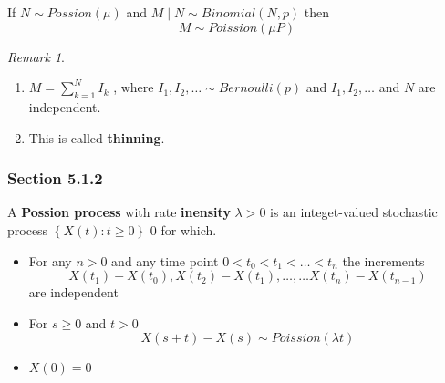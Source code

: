 \documentclass{article}
\theoremstyle{remark}
\newtheorem*{remark}{Remark}
\begin{document}
\begin{theorem}
  If $N \sim Possion(\mu )$  and $ M  \mid  N \sim Binomial(N,p)$ then \[
    M \sim Poission(\mu P)
  \]  
\end{theorem}

\begin{remark}
  \begin{enumerate}[label=(\roman*)]
    \item $M = \sum_{k= 1}^{ N}  I_{k}$ , where $ I_{1}, I_{2} , \ldots \sim Bernoulli (p)$ and $I_{1}, I_{2} , \ldots$ and $N$ are independent. 
    \item This is called \textbf{thinning}.  
  \end{enumerate}
\end{remark}

\subsubsection{Section 5.1.2}%
\label{ssub:section_5_1_2}

\begin{definition}
  A \textbf{Possion process}  with rate  \textbf{inensity}  $ \lambda > 0$ is an integet-valued stochastic process $\left\{ X\left( t \right): t \ge 0 \right\}$ 0 for which.  
  \begin{itemize}
    \item For any $n>0$ and any time point $0< t_{0} < t_{1} < \ldots < t_{n}$ the increments \[
    X\left( t_{1}  \right) - X\left( t_{0} \right) , X\left( t_{2} \right) - X\left( t_{1} \right) , \ldots , \ldots X\left( t_{n} \right) - X\left( t_{n-1} \right)
    \] 
    are independent 
  \item For $s\ge 0$ and $t> 0$  \[
      X\left( s+t \right)  - X\left( s \right) \sim Poission(\lambda t)
  \] 
\item $X\left( 0 \right) = 0$
  \end{itemize}
\end{definition}
\end{document}
